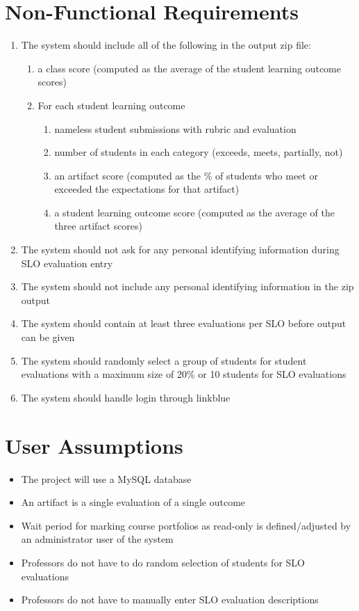 \documentclass[a4paper,12pt]{article}
\begin{document}
\section*{Non-Functional Requirements}
\begin{enumerate}
\item The system should include all of the following in the output zip file:
	\begin{enumerate}
	\item a class score (computed as the average of the student learning outcome scores)
	\item For each student learning outcome
		\begin{enumerate}
		\item nameless student submissions with rubric and evaluation
		\item number of students in each category (exceeds, meets, partially, not)
		\item an artifact score (computed as the \% of students who meet or exceeded the expectations for that artifact)
		\item a student learning outcome score (computed as the average of the three artifact scores)
		\end{enumerate}
	\end{enumerate}
\item The system should not ask for any personal identifying information during SLO evaluation entry
\item The system should not include any personal identifying information in the zip output
\item The system should contain at least three evaluations per SLO before output can be given
\item The system should randomly select a group of students for student evaluations with a maximum size of 20\% or 10 students for SLO evaluations
\item The system should handle login through linkblue
\end{enumerate}

\section*{User Assumptions}
\begin{itemize}
\item The project will use a MySQL database
\item An artifact is a single evaluation of a single outcome 
\item Wait period for marking course portfolios as read-only is defined/adjusted by an administrator user of the system 
\item Professors do not have to do random selection of students for SLO evaluations 
\item Professors do not have to manually enter SLO evaluation descriptions 
\end{itemize}
\end{document}
